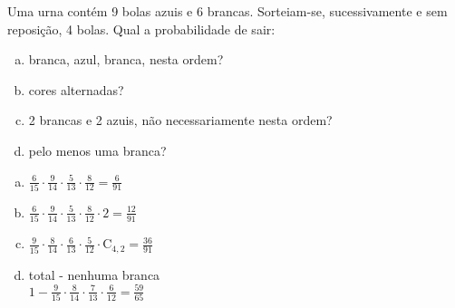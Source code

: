 \begin{ex}
 Uma urna contém 9 bolas azuis e 6 brancas. Sorteiam-se, sucessivamente e sem reposição, 4 bolas. Qual a probabilidade de sair:
    \begin{enumerate}[(a)]
    \item branca, azul, branca, nesta ordem?
    \item cores alternadas?
    \item 2 brancas e 2 azuis, não necessariamente nesta ordem?
    \item pelo menos uma branca?
    \end{enumerate}	
      \begin{sol}
      \phantom{A}
        \begin{enumerate}  [(a)]
            \item $\frac{6}{15}\cdot\frac{9}{14}\cdot\frac{5}{13}\cdot\frac{8}{12}=\frac{6}{91}$
            \item
            $\frac{6}{15}\cdot\frac{9}{14}\cdot\frac{5}{13}\cdot\frac{8}{12}\cdot2=\frac{12}{91}$
            \item
            $\frac{9}{15}\cdot\frac{8}{14}\cdot\frac{6}{13}\cdot\frac{5}{12}\cdot\mathrm{C}_{4,2}=\frac{36}{91}$
            \item total - nenhuma branca \\
            $1-\frac{9}{15}\cdot\frac{8}{14}\cdot\frac{7}{13}\cdot\frac{6}{12}=\frac{59}{65}$
        \end{enumerate}
      \end{sol}
\end{ex}